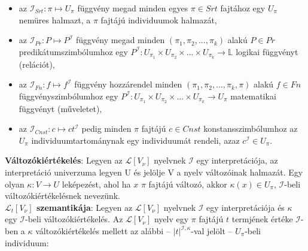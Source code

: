 \documentclass[margin=0px]{article}
\begin{document}
	\begin{itemize}
		\item	az $\mathcal{I}_{Srt} : \pi \mapsto U_{\pi}$ függvény megad minden egyes $\pi \in Srt$ fajtához
		egy $U_{\pi}$ nemüres halmazt, a $\pi$ fajtájú individuumok halmazát,
		
		\item	az $\mathcal{I}_{Pr} : P \mapsto P^{\mathcal{I}}$ függvény megad minden
		$(\pi_{1}, \pi_{2}, ..., \pi_{k})$ alakú $P \in Pr$ predikátumszimbólumhoz egy
		$P^{\mathcal{I}} : U_{\pi_{1}} \times U_{\pi_{2}} \times ... \times U_{\pi_{k}} \to \mathbb{L}$
		logikai függvényt (relációt),
		
		\item	az $\mathcal{I}_{Fn} : f \mapsto f^{\mathcal{I}}$ függvény hozzárendel minden
		$(\pi_{1}, \pi_{2}, ..., \pi_{k}, \pi)$ alakú $f \in Fn$ függvényszimbólumhoz egy
		$P^{\mathcal{I}} : U_{\pi_{1}} \times U_{\pi_{2}} \times ... \times U_{\pi_{k}} \to U_{\pi}$
		matematikai függvényt (műveletet),
		
		\item	az $\mathcal{I}_{Cnst} : c \mapsto ct^{\mathcal{I}}$ pedig minden $\pi$ fajtájú
		$c \in Cnst$ konstansszimbólumhoz az $U_{\pi}$ individuumtartománynak egy individuumát
		rendeli, azaz $c^{\mathcal{I}} \in U_{\pi}$.
 	\end{itemize}
 	
 	\noindent \textbf{Változókiértékelés}: Legyen az $\mathcal{L}[V_{\nu}]$ nyelvnek $\mathcal{I}$ egy interpretációja,
 	az interpretáció univerzuma legyen U és jelölje V a nyelv változóinak halmazát. Egy olyan $\kappa : V \to U$ leképezést,
 	ahol ha $x$ $\pi$ fajtájú változó, akkor $\kappa(x) \in U_{\pi}$, $\mathcal{I}$-beli változókiértékelésnek nevezünk.\\
 	
 	\noindent \textbf{$\mathcal{L}_{t}[V_{\nu}]$ szemantikája}:
 	Legyen az $\mathcal{L}[V_{\nu}]$ nyelvnek $\mathcal{I}$ egy interpretációja és $\kappa$ egy $\mathcal{I}$-beli
 	változókiértékelés. Az $\mathcal{L}[V_{\nu}]$ nyelv egy $\pi$ fajtájú $t$ termjének értéke $\mathcal{I}$-ben
 	a $\kappa$ változókiértékelés mellett az alábbi -- $|t|^{\mathcal{I},\kappa}$-val jelölt -- $U_{\pi}$-beli
 	individuum:
 	
\end{document}
